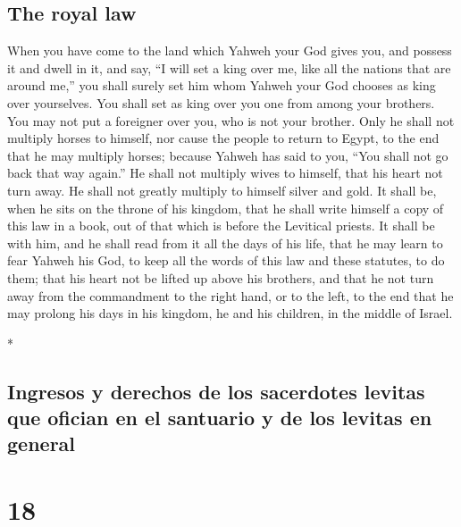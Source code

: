 \begin{paracol}{2}
\begin{otherlanguage}{english}
\hypertarget{the-royal-law}{%
\subsection{The royal law}\label{the-royal-law}}

 When you have come to the land which Yahweh your God
gives you, and possess it and dwell in it, and say, ``I will set a king
over me, like all the nations that are around me,''  you
shall surely set him whom Yahweh your God chooses as king over
yourselves. You shall set as king over you one from among your brothers.
You may not put a foreigner over you, who is not your brother.
 Only he shall not multiply horses to himself, nor cause
the people to return to Egypt, to the end that he may multiply horses;
because Yahweh has said to you, ``You shall not go back that way
again.''  He shall not multiply wives to himself, that
his heart not turn away. He shall not greatly multiply to himself silver
and gold.  It shall be, when he sits on the throne of his
kingdom, that he shall write himself a copy of this law in a book, out
of that which is before the Levitical priests.  It shall
be with him, and he shall read from it all the days of his life, that he
may learn to fear Yahweh his God, to keep all the words of this law and
these statutes, to do them;  that his heart not be lifted
up above his brothers, and that he not turn away from the commandment to
the right hand, or to the left, to the end that he may prolong his days
in his kingdom, he and his children, in the middle of Israel.

\end{otherlanguage}

\switchcolumn[0]*

\hypertarget{ingresos-y-derechos-de-los-sacerdotes-levitas-que-ofician-en-el-santuario-y-de-los-levitas-en-general}{%
\subsection{Ingresos y derechos de los sacerdotes levitas que ofician en
el santuario y de los levitas en
general}\label{ingresos-y-derechos-de-los-sacerdotes-levitas-que-ofician-en-el-santuario-y-de-los-levitas-en-general}}

\hypertarget{section-34}{%
\section{18}\label{section-34}}


\end{paracol}
